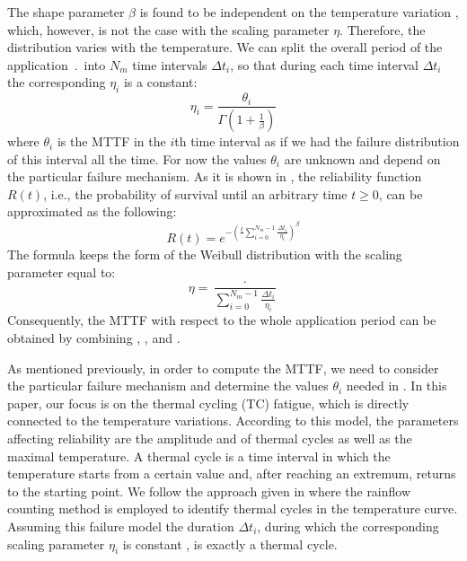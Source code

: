 The shape parameter $\beta$ is found to be independent on the temperature variation \cite{chang2006}, which, however, is not the case with the scaling parameter $\eta$. Therefore, the distribution varies with the temperature. We can split the overall period of the application $\period$ into $N_m$ time intervals $\Delta t_i$, so that during each time interval $\Delta t_i$ the corresponding $\eta_i$ is a constant:
\begin{equation} \label{eq:eta-one}
  \eta_i = \frac{\theta_i}{\Gamma(1 + \frac{1}{\beta})}
\end{equation}
where $\theta_i$ is the MTTF in the $i$th time interval as if we had the failure distribution of this interval all the time. For now the values $\theta_i$ are unknown and depend on the particular failure mechanism. As it is shown in \cite{xiang2010}, the reliability function $R(t)$, i.e., the probability of survival until an arbitrary time $t \geq 0$, can be approximated as the following:
\[
  R(t) = e^{-(\frac{t}{\period} \sum_{i=0}^{N_m - 1} \frac{\Delta t_i}{\eta_i})^\beta}
\]
The formula keeps the form of the Weibull distribution with the scaling parameter equal to:
\begin{equation} \label{eq:eta-many}
  \eta = \frac{\period}{\sum_{i=0}^{N_m - 1} \frac{\Delta t_i}{\eta_i}}
\end{equation}
Consequently, the MTTF with respect to the whole application period can be obtained by combining , , and .

As mentioned previously, in order to compute the MTTF, we need to consider the particular failure mechanism and determine the values $\theta_i$ needed in . In this paper, our focus is on the thermal cycling (TC) fatigue, which is directly connected to the temperature variations. According to this model, the parameters affecting reliability are the amplitude and  of thermal cycles as well as the maximal temperature. A thermal cycle is a time interval in which the temperature starts from a certain value and, after reaching an extremum, returns  to the starting point. We follow the approach given in \cite{xiang2010} where the rainflow counting method is employed to identify thermal cycles in the temperature curve. Assuming this  failure model the duration $\Delta t_i$, during which the corresponding scaling parameter $\eta_i$ is constant , is exactly a thermal cycle.

